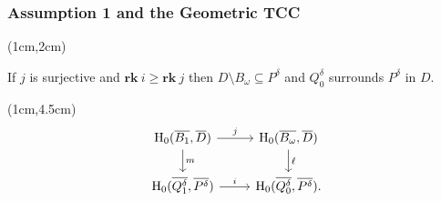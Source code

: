 \begin{frame}
  \frametitle{{\small Assumption 1 and the Geometric TCC}}

  \begin{textblock*}{11cm}(1cm,2cm)
    \begin{small}\begin{theorem}
        If $j$ is surjective and $\mathbf{rk}~i\geq \mathbf{rk}~j$ then $D\setminus B_\omega\subseteq P^\delta$ and $Q_0^\delta$ surrounds $P^\delta$ in $D$.
    \end{theorem}\end{small}
  \end{textblock*}


  \begin{textblock*}{11cm}(1cm,4.5cm)
    \[\begin{tikzcd}[ampersand replacement=\&]
      \hom_0(\overline{B_1},\overline{D})\arrow{d}{m} \arrow{r}{j} \&
      \hom_0(\overline{B_\omega}, \overline{D}) \arrow{d}{\ell} \\
      \hom_0(\overline{Q_1^\delta}, \overline{P^\delta}) \arrow{r}{i} \&
      \hom_0(\overline{Q_0^\delta}, \overline{P^\delta}).
    \end{tikzcd}\]
  \end{textblock*}
\end{frame}

%
%
%

